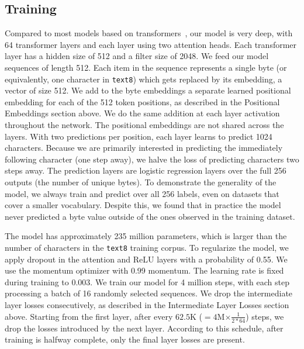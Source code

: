 \documentclass[letterpaper]{article}
\newcommand{\texteight}{\texttt{text8}}
\newcommand{\todo}[1]{{\footnotesize\color{red}{\textbf{#1}}}}
\newcommand{\comment}[1]{}
\begin{document}
\subsection{Training}

\comment{
\todo{Any discussion on less heads working better for some reason?}
}

Compared to most models based on transformers~\cite{NIPS2017_7181,DBLP:journals/corr/abs-1803-05573},
our model is very deep, with 64 transformer layers and each layer using two attention heads.
Each transformer layer has a hidden size of 512 and a filter size of 2048.
We feed our model sequences of length 512.
Each item in the sequence represents a single byte (or equivalently, one character in \texteight{}) which gets replaced by its embedding, a vector of size 512.
We add to the byte embeddings a separate learned positional embedding for each of the 512 token positions, as described in the Positional Embeddings section above.
We do the same addition at each layer activation throughout the network.
The positional embeddings are not shared across the layers.
With two predictions per position, each layer learns to predict 1024 characters.
Because we are primarily interested in predicting the immediately following character (one step away), we halve the loss of predicting characters two steps away.
The prediction layers are logistic regression layers over the full 256 outputs (the number of unique bytes). To demonstrate the generality of the model, we always train and predict over all 256 labels, even on datasets that cover a smaller vocabulary.
Despite this, we found that in practice the model never predicted a byte value outside of the ones observed in the training dataset.

The model has approximately 235 million parameters, which is larger than the number of characters in the \texteight{} training corpus.
To regularize the model, we apply dropout in the attention and ReLU layers with a probability of 0.55.
We use the momentum optimizer with 0.99 momentum.
The learning rate is fixed during training to 0.003.
We train our model for 4 million steps, with each step processing a batch of 16 randomly selected sequences.
We drop the intermediate layer losses consecutively, as described in the Intermediate Layer Losses section above.
Starting from the first layer, after every $62.5$K ($=4$M$\times \frac{1}{2*64}$) steps, we drop the losses introduced by the next layer.
According to this schedule, after training is halfway complete, only the final layer losses are present.
\end{document}

